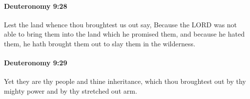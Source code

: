 		\paragraph{Deuteronomy 9:28} %
			\label{DEUTERONOMY-9-28}

			Lest the land whence thou broughtest us out say, Because the LORD was not able to bring them into the land which he promised them, and because he hated them, he hath brought them out to slay them in the wilderness.


		\paragraph{Deuteronomy 9:29} %
			\label{DEUTERONOMY-9-29}

			Yet they are thy people and thine inheritance, which thou broughtest out by thy mighty power and by thy stretched out arm.

